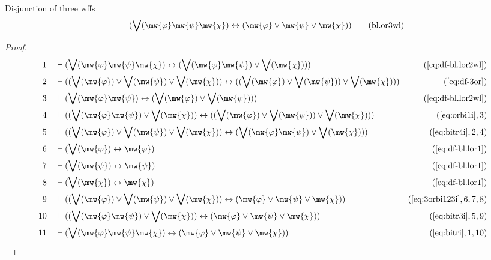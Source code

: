 \begin{lemma} Disjunction of three wffs
\begin{align}
\vdash ( \bigvee( \mw{\varphi} \mw{\psi} \mw{\chi} ) \leftrightarrow (
    \mw{\varphi} \vee \mw{\psi} \vee \mw{\chi} )
    )\label{eq:bl.or3wl}\tag{bl.or3wl}
\end{align}
\end{lemma}

\begin{proof}
\begin{align}
  1 &&  & \vdash ( \bigvee( \mw{\varphi} \mw{\psi} \mw{\chi} ) \leftrightarrow ( \bigvee( \mw{\varphi} \mw{\psi} ) \vee \bigvee( \mw{\chi} ) ) )&(\mbox{\ref{eq:df-bl.lor2wl}})\notag
  \\ 2 &&  & \vdash ( ( \bigvee( \mw{\varphi} ) \vee \bigvee( \mw{\psi} ) \vee \bigvee( \mw{\chi} ) ) \leftrightarrow ( ( \bigvee( \mw{\varphi} ) \vee \bigvee( \mw{\psi} ) ) \vee \bigvee( \mw{\chi} ) ) )&(\mbox{\ref{eq:df-3or}})\notag
  \\ 3 &&  & \vdash ( \bigvee( \mw{\varphi} \mw{\psi} ) \leftrightarrow ( \bigvee( \mw{\varphi} ) \vee \bigvee( \mw{\psi} ) ) )&(\mbox{\ref{eq:df-bl.lor2wl}})\notag
  \\ 4 &&  & \vdash ( ( \bigvee( \mw{\varphi} \mw{\psi} ) \vee \bigvee( \mw{\chi} ) ) \leftrightarrow ( ( \bigvee( \mw{\varphi} ) \vee \bigvee( \mw{\psi} ) ) \vee \bigvee( \mw{\chi} ) ) )&(\mbox{\ref{eq:orbi1i}},3)\notag
  \\ 5 &&  & \vdash ( ( \bigvee( \mw{\varphi} ) \vee \bigvee( \mw{\psi} ) \vee \bigvee( \mw{\chi} ) ) \leftrightarrow ( \bigvee( \mw{\varphi} \mw{\psi} ) \vee \bigvee( \mw{\chi} ) ) )&(\mbox{\ref{eq:bitr4i}},2,4)\notag
  \\ 6 &&  & \vdash ( \bigvee( \mw{\varphi} ) \leftrightarrow \mw{\varphi} )&(\mbox{\ref{eq:df-bl.lor1}})\notag
  \\ 7 &&  & \vdash ( \bigvee( \mw{\psi} ) \leftrightarrow \mw{\psi} )&(\mbox{\ref{eq:df-bl.lor1}})\notag
  \\ 8 &&  & \vdash ( \bigvee( \mw{\chi} ) \leftrightarrow \mw{\chi} )&(\mbox{\ref{eq:df-bl.lor1}})\notag
  \\ 9 &&  & \vdash ( ( \bigvee( \mw{\varphi} ) \vee \bigvee( \mw{\psi} ) \vee \bigvee( \mw{\chi} ) ) \leftrightarrow ( \mw{\varphi} \vee \mw{\psi} \vee \mw{\chi} ) )&(\mbox{\ref{eq:3orbi123i}},6,7,8)\notag
  \\ 10 &&  & \vdash ( ( \bigvee( \mw{\varphi} \mw{\psi} ) \vee \bigvee( \mw{\chi} ) ) \leftrightarrow ( \mw{\varphi} \vee \mw{\psi} \vee \mw{\chi} ) )&(\mbox{\ref{eq:bitr3i}},5,9)\notag
  \\ 11 &&  & \vdash ( \bigvee( \mw{\varphi} \mw{\psi} \mw{\chi} ) \leftrightarrow ( \mw{\varphi} \vee \mw{\psi} \vee \mw{\chi} ) )&(\mbox{\ref{eq:bitri}},1,10)\notag
\end{align}
\end{proof}

